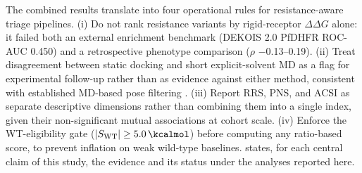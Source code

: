 \documentclass[journal=jcisd8,manuscript=article,layout=traditional]{achemso}
\begin{document}
The combined results translate into four operational rules for resistance-aware triage pipelines. (i) Do not rank resistance variants by rigid-receptor $\Delta\Delta G$ alone: it failed both an external enrichment benchmark (DEKOIS 2.0 PfDHFR ROC-AUC \num{0.450}) and a retrospective phenotype comparison ($\rho$ \numrange{-0.13}{0.19}). (ii) Treat disagreement between static docking and short explicit-solvent MD as a flag for experimental follow-up rather than as evidence against either method, consistent with established MD-based pose filtering \citep{liu2017mdfilter}. (iii) Report RRS, PNS, and ACSI as separate descriptive dimensions rather than combining them into a single index, given their non-significant mutual associations at cohort scale. (iv) Enforce the WT-eligibility gate ($|S_{\mathrm{WT}}| \ge \qty{5.0}{\kcalmol}$) before computing any ratio-based score, to prevent inflation on weak wild-type baselines.  states, for each central claim of this study, the evidence and its status under the analyses reported here.
\end{document}
